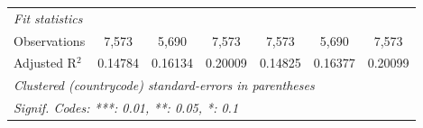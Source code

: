 \begin{tabular}{lcccccc}
   \midrule
   \emph{Fit statistics}\\
   Observations                                                                              & 7,573       & 5,690                   & 7,573           & 7,573    & 5,690                   & 7,573\\  
   Adjusted R$^2$                                                                            & 0.14784     & 0.16134                 & 0.20009         & 0.14825  & 0.16377                 & 0.20099\\  
   \midrule \midrule
   \multicolumn{7}{l}{\emph{Clustered (countrycode) standard-errors in parentheses}}\\
   \multicolumn{7}{l}{\emph{Signif. Codes: ***: 0.01, **: 0.05, *: 0.1}}\\
\end{tabular}
\par\endgroup


